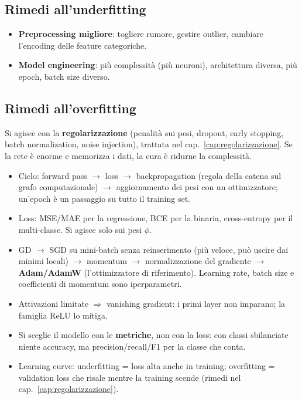 \subsection{Rimedi all'underfitting}
\begin{itemize}
  \item \textbf{Preprocessing migliore}: togliere rumore, gestire outlier, cambiare l'encoding delle feature categoriche.
  \item \textbf{Model engineering}: più complessità (più neuroni), architettura diversa, più epoch, batch size diverso.
\end{itemize}

\subsection{Rimedi all'overfitting}
Si agisce con la \textbf{regolarizzazione} (penalità sui pesi, dropout, early stopping, batch normalization, noise injection),
trattata nel cap.~\ref{cap:regolarizzazione}. Se la rete è enorme e memorizza i dati, la cura è ridurne la complessità.

\begin{sintesi}
\begin{itemize}
  \item Ciclo: forward pass $\to$ loss $\to$ backpropagation (regola della catena sul grafo computazionale) $\to$ aggiornamento
        dei pesi con un ottimizzatore; un'epoch è un passaggio su tutto il training set.
  \item Loss: MSE/MAE per la regressione, BCE per la binaria, cross-entropy per il multi-classe. Si agisce solo sui pesi $\phi$.
  \item GD $\to$ SGD su mini-batch senza reinserimento (più veloce, può uscire dai minimi locali) $\to$ momentum $\to$
        normalizzazione del gradiente $\to$ \textbf{Adam/AdamW} (l'ottimizzatore di riferimento). Learning rate, batch size e
        coefficienti di momentum sono iperparametri.
  \item Attivazioni limitate $\Rightarrow$ vanishing gradient: i primi layer non imparano; la famiglia ReLU lo mitiga.
  \item Si sceglie il modello con le \textbf{metriche}, non con la loss: con classi sbilanciate niente accuracy, ma
        precision/recall/F1 per la classe che conta.
  \item Learning curve: underfitting = loss alta anche in training; overfitting = validation loss che risale mentre la training
        scende (rimedi nel cap.~\ref{cap:regolarizzazione}).
\end{itemize}
\end{sintesi}
